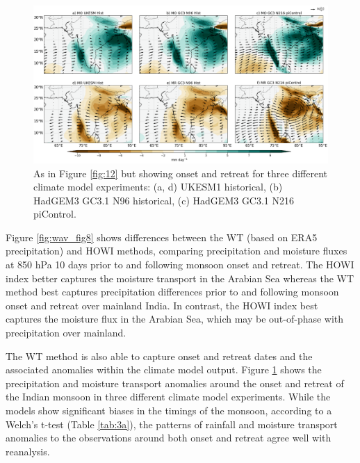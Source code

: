 \begin{figure}[t!]
\centering
 \includegraphics[width=\linewidth]{figures/ind_models.png}
\caption[Indian monsoon precipitation anomalies associated with onset]{ As in Figure \ref{fig:12} but showing onset and retreat for three different climate model experiments: (a, d) UKESM1 historical, (b) HadGEM3 GC3.1 N96 historical, (c) HadGEM3 GC3.1 N216 piControl.   }
\label{fig:indmodels}
\end{figure}

Figure \ref{fig:wav_fig8} shows differences between the WT (based on ERA5 precipitation) and HOWI methods, comparing precipitation and moisture fluxes at 850 hPa 10 days prior to and following monsoon onset and retreat. The HOWI index better captures the moisture transport in the Arabian Sea whereas the WT method best captures precipitation differences prior to and following monsoon onset and retreat over mainland India. In contrast, the HOWI index best captures the moisture flux in the Arabian Sea, which may be out-of-phase with precipitation over mainland. 


 The WT method is also able to capture onset and retreat dates and the associated anomalies within the climate model output. Figure \ref{fig:indmodels} shows the precipitation and moisture transport anomalies around the onset and retreat of the Indian monsoon in three different climate model experiments. While the models show significant biases in the timings of the monsoon, according to a Welch's t-test (Table \ref{tab:3a}), the patterns of rainfall and moisture transport anomalies to the observations around both onset and retreat agree well with reanalysis.

